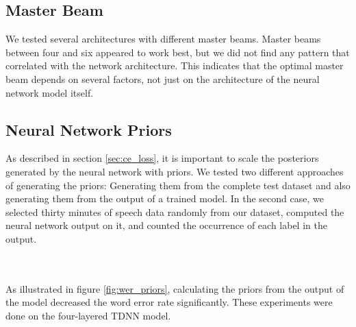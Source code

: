 \subsection{Master Beam}
We tested several architectures with different master beams. Master beams between four and six appeared to work best, but we did not find any pattern that correlated with the network architecture. This indicates that the optimal master beam depends on several factors, not just on the architecture of the neural network model itself. 
\subsection{Neural Network Priors}
\label{sec:tdnn_prior}
As described in section \ref{sec:ce_loss}, it is important to scale the posteriors generated by the neural network with priors. We tested two different approaches of generating the priors: Generating them from the complete test dataset and also generating them from the output of a trained model. In the second case, we selected thirty minutes of speech data randomly from our dataset, computed the neural network output on it, and counted the occurrence of each label in the output. \\ \\
\begin{minipage}{\linewidth}
	\centering
	\label{fig:wer_priors}
\end{minipage} 
\\
As illustrated in figure \ref{fig:wer_priors}, calculating the priors from the output of the model decreased the word error rate significantly. These experiments were done on the four-layered TDNN model. 
